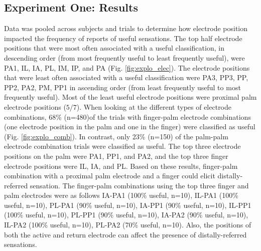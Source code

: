 \documentclass[10pt]{iopart}
\begin{document}
\subsection{Experiment One: Results}
Data was pooled across subjects and trials to determine how electrode position impacted the frequency of reports of useful sensations. The top half electrode positions that were most often associated with a useful classification, in descending order (from most frequently useful to least frequently useful), were PA1, IL, IA, PL, IM, IP, and PA (Fig. \ref{fig:explo_elec}). The electrode positions that were least often associated with a useful classification were PA3, PP3, PP, PP2, PA2, PM, PP1 in ascending order (from least frequently useful to most frequently useful). Most of the least useful electrode positions were proximal palm electrode positions ($5/7$). When looking at the different types of electrode combinations, 68\% (n=480)of the trials with finger-palm electrode combinations (one electrode position in the palm and one in the finger) were classified as useful (Fig. \ref{fig:explo_comb}). In contrast, only 23\% (n=150) of the palm-palm electrode combination trials were classified as useful. The top three electrode positions on the palm were PA1, PP1, and PA2, and the top three finger electrode positions were IL, IA, and PL. Based on these results, finger-palm combination with a proximal palm electrode and a finger could elicit distally-referred sensation. The finger-palm combinations using the top three finger and palm electrodes were as follows IA-PA1 (100\% useful, n=10), IL-PA1 (100\% useful, n=10), PL-PA1 (90\% useful, n=10), IA-PP1 (90\% useful, n=10), IL-PP1 (100\% useful, n=10), PL-PP1 (90\% useful, n=10), IA-PA2 (90\% useful, n=10), IL-PA2 (100\% useful, n=10), PL-PA2 (70\% useful, n=10). Also, the positions of both the active and return electrode can affect the presence of distally-referred sensations. 
\end{document}
